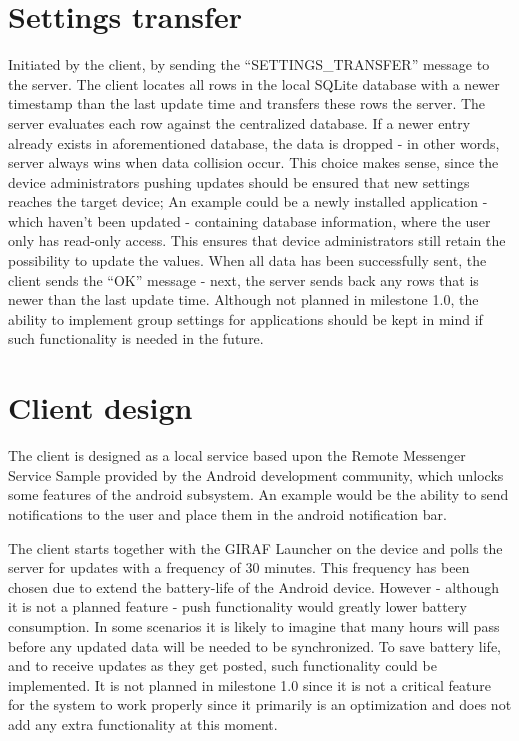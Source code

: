 \section{Settings transfer}
Initiated by the client, by sending the ``SETTINGS\_TRANSFER'' message to the server. The client locates all rows in the local SQLite database with a newer timestamp than the last update time and transfers these rows the server. The server evaluates each row against the centralized database. If a newer entry already exists in aforementioned database, the data is dropped - in other words, server always wins when data collision occur. This choice makes sense, since the device administrators pushing updates should be ensured that new settings reaches the target device; An example could be a newly installed application - which haven't been updated - containing database information, where the user only has read-only access. This ensures that device administrators still retain the possibility to update the values.
When all data has been successfully sent, the client sends the ``OK'' message - next, the server sends back any rows that is newer than the last update time. Although not planned in milestone 1.0, the ability to implement group settings for applications should be kept in mind if such functionality is needed in the future. 


\section{Client design}
The client is designed as a local service based upon the Remote Messenger Service Sample provided by the Android development community\cite{AndDevel3}, which unlocks some features of the android subsystem. An example would be the ability to send notifications to the user and place them in the android notification bar.

The client starts together with the GIRAF Launcher on the device and polls the server for updates with a frequency of 30 minutes. This frequency has been chosen due to extend the battery-life of the Android device. However - although it is not a planned feature - push functionality would greatly lower battery consumption. In some scenarios it is likely to imagine that many hours will pass before any updated data will be needed to be synchronized. To save battery life, and to receive updates as they get posted, such functionality could be implemented. It is not planned in milestone 1.0 since it is not a critical feature for the system to work properly since it primarily is an optimization and does not add any extra functionality at this moment. 

